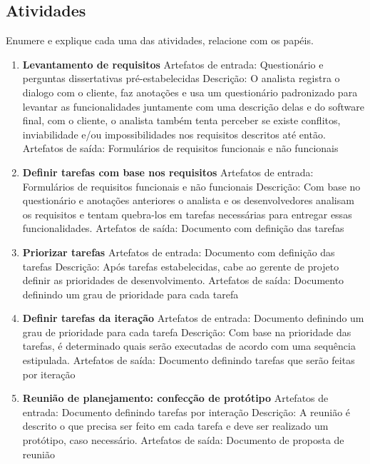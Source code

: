 \documentclass[	DIV=calc,%
							paper=a4,%
							fontsize=12pt,%
							onecolumn]{scrartcl}	 					%
\begin{document}
\subsection{Atividades}
Enumere e explique cada uma das atividades, relacione com os papéis.
\begin{enumerate}
	\item \textbf{Levantamento de requisitos}
	\subitem Artefatos de entrada: Questionário e perguntas dissertativas pré-estabelecidas
	\subitem Descrição: O analista registra o dialogo com o cliente, faz anotações e usa um questionário padronizado para levantar as funcionalidades juntamente com uma descrição delas e do software final, com o cliente, o analista também tenta perceber se existe conflitos, inviabilidade e/ou impossibilidades nos requisitos descritos até então.
	\subitem Artefatos de saída: Formulários de requisitos funcionais e não funcionais	
	\item \textbf{Definir tarefas com base nos requisitos}
	\subitem Artefatos de entrada: Formulários de requisitos funcionais e não funcionais
	\subitem Descrição: Com base no questionário e anotações anteriores o analista e os desenvolvedores analisam os requisitos e tentam quebra-los em tarefas necessárias para entregar essas funcionalidades.
	\subitem Artefatos de saída: Documento com definição das tarefas

	\item \textbf{Priorizar tarefas} 
	\subitem Artefatos de entrada: Documento com definição das tarefas
	\subitem Descrição: 
	Após tarefas estabelecidas, cabe ao gerente de projeto definir as prioridades de desenvolvimento.
	\subitem Artefatos de saída: Documento definindo um grau de prioridade para cada tarefa

	\item \textbf{Definir tarefas da iteração} 
	\subitem Artefatos de entrada: Documento definindo um grau de prioridade para cada tarefa
	\subitem Descrição: Com base na prioridade das tarefas, é determinado quais serão executadas de acordo com uma sequência estipulada. 
	\subitem Artefatos de saída: Documento definindo tarefas que serão feitas por iteração
	
	\item \textbf{Reunião de planejamento: confecção de protótipo}
	\subitem Artefatos de entrada: Documento definindo tarefas por interação
	\subitem Descrição: 
	A reunião é descrito o que precisa ser feito em cada tarefa e deve ser realizado um protótipo, caso necessário.
	\subitem Artefatos de saída: Documento de proposta de reunião
	

\end{enumerate}
\end{document}
